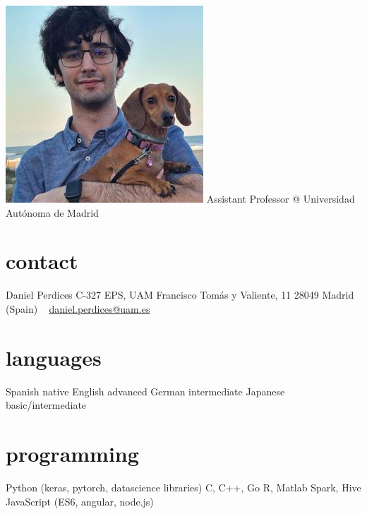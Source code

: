 \documentclass[]{friggeri-cv}
\begin{document}

\begin{aside}
\includegraphics[width=\columnwidth]{img/dp_dog.jpeg}
Assistant Professor @ Universidad Autónoma de Madrid
  \section{contact}
    Daniel Perdices
    C-327
    EPS, UAM 
    Francisco Tomás y Valiente, 11 
    28049 Madrid (Spain)
    ~
    \href{mailto:daniel.perdices@uam.es}{daniel.perdices@uam.es}
  \section{languages}
    Spanish native
    English advanced
    German intermediate 
    Japanese basic/intermediate
  \section{programming}
    Python (keras, pytorch, datascience libraries)
    C, C++, Go
    R, Matlab
    Spark, Hive
    JavaScript
    (ES6, angular, node.js)
\end{aside}
\end{document}
